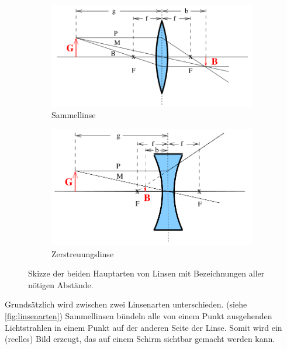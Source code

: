 \begin{figure}
    \centering
    \begin{subfigure}{0.4\textwidth}
        \centering
        \includegraphics[width=\textwidth]{images/skizze_linse_1.png}
        \caption{Sammellinse}
        \label{fig:skizze_linse_1}
    \end{subfigure}    
    \begin{subfigure}{0.4\textwidth}
        \centering
        \includegraphics[width=\textwidth]{images/skizze_linse_2.png}
        \caption{Zerstreuungslinse}
        \label{fig:skizze_linse_2}
    \end{subfigure}    
    \caption{Skizze der beiden Hauptarten von Linsen mit Bezeichnungen aller nötigen Abstände. \cite{V408}}
    \label{fig:linsenarten}
\end{figure}

Grundsätzlich wird zwischen zwei Linsenarten unterschieden. (siehe \autoref{fig:linsenarten})
Sammellinsen bündeln alle von einem Punkt ausgehenden Lichtstrahlen in einem Punkt auf der anderen Seite der Linse.
Somit wird ein (reelles) Bild erzeugt, das auf einem Schirm sichtbar gemacht werden kann.

